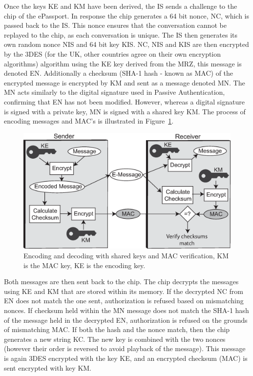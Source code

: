 \documentclass[12pt]{article}
\begin{document}
Once the keys KE and KM have been derived, the IS sends a challenge to the chip of the ePassport. In response the chip generates a 64 bit nonce, NC, which is passed back to the IS. This nonce ensures that the conversation cannot be replayed to the chip, as each conversation is unique. The IS then generates its own random nonce NIS and 64 bit key KIS. NC, NIS and KIS are then encrypted by the 3DES (for the UK, other countries agree on their own encryption algorithms) algorithm using the KE key derived from the MRZ, this message is denoted EN. Additionally a checksum (SHA-1 hash - known as MAC) of the encrypted message is encrypted by KM and sent as a message denoted MN. The MN acts similarly to the digital signature used in Passive Authentication, confirming that EN has not been modified. However, whereas a digital signature is signed with a private key, MN is signed with a shared key KM. The process of encoding messages and MAC's is illustrated in Figure~\ref{fig:MACencoding}.

\begin{figure}
\centering
\includegraphics[width=5.5in]{MAC.eps}
\caption{Encoding and decoding with shared keys and MAC verification, KM is the MAC key, KE is the encoding key.}
\label{fig:MACencoding}
\end{figure}

Both messages are then sent back to the chip. The chip decrypts the messages using KE and KM that are stored within its memory. If the decrypted NC from EN does not match the one sent, authorization is refused based on mismatching nonces. If checksum held within the MN message does not match the SHA-1 hash of the message held in the decrypted EN, authorization is refused on the grounds of mismatching MAC. If both the hash and the nonce match, then the chip generates a new string KC. The new key is combined with the two nonces (however their order is reversed to avoid playback of the message). This message is again 3DES encrypted with the key KE, and an encrypted checksum (MAC) is sent encrypted with key KM. 
\end{document}
